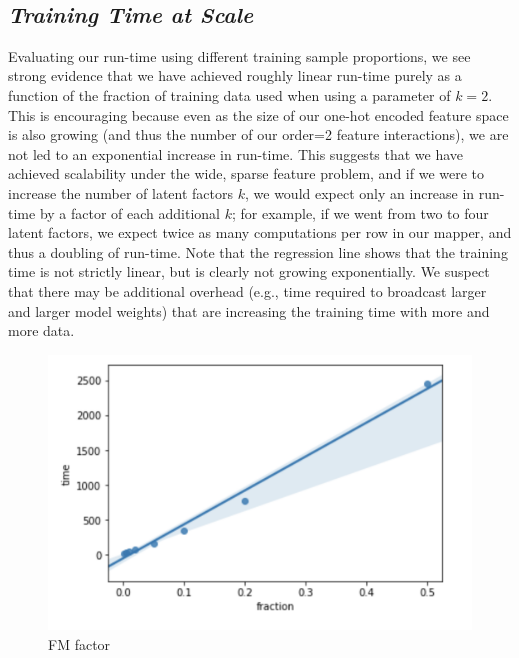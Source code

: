 \documentclass[11pt]{article}
\makeatletter
\def\maxwidth{\ifdim\Gin@nat@width>\linewidth\linewidth
    \else\Gin@nat@width\fi}
\let\Oldincludegraphics\includegraphics
\renewcommand{\includegraphics}[1]{\Oldincludegraphics[width=.8\maxwidth]{#1}}
\makeatother
\begin{document}
    \begin{center}
    \end{center}
    { \hspace*{\fill} \\}
    
    \subsection{\texorpdfstring{\emph{Training Time at
Scale}}{Training Time at Scale}}\label{training-time-at-scale}

Evaluating our run-time using different training sample proportions, we
see strong evidence that we have achieved roughly linear run-time purely
as a function of the fraction of training data used when using a
parameter of \(k=2\). This is encouraging because even as the size of
our one-hot encoded feature space is also growing (and thus the number
of our order=2 feature interactions), we are not led to an exponential
increase in run-time. This suggests that we have achieved scalability
under the wide, sparse feature problem, and if we were to increase the
number of latent factors \(k\), we would expect only an increase in
run-time by a factor of each additional \(k\); for example, if we went
from two to four latent factors, we expect twice as many computations
per row in our mapper, and thus a doubling of run-time. Note that the
regression line shows that the training time is not strictly linear, but
is clearly not growing exponentially. We suspect that there may be
additional overhead (e.g., time required to broadcast larger and larger
model weights) that are increasing the training time with more and more
data.

    \begin{figure}
\centering
\includegraphics{FINAL/images/Training_Time.png}
\caption{FM factor}
\end{figure}
\end{document}
